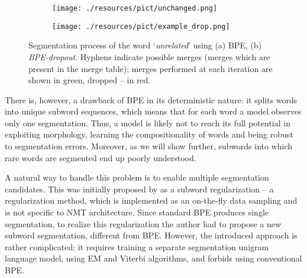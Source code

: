 \documentclass[11pt,a4paper]{article}
\begin{document}
\begin{figure*}[t!]
    \centering
    \begin{subfigure}[b]{0.18\textwidth}
        \texttt{[image: ./resources/pict/unchanged.png]}
        \caption{}
        \label{fig:examples_original}
    \end{subfigure}
    \quad\quad\quad\quad
    \begin{subfigure}[b]{0.65\textwidth}
        \texttt{[image: ./resources/pict/example\_drop.png]}
        \caption{}
        \label{fig:examples_dropout}
    \end{subfigure}
    \vspace{-1ex}
    \caption{Segmentation process of the word `\textit{unrelated}' using (a) BPE, (b) \textit{BPE-dropout}. Hyphens indicate possible merges (merges which are present in the merge table); merges performed at each iteration are shown in green, dropped -- in red. }\label{fig:intro_examples}
    \vspace{-2ex}
\end{figure*}


There is, however, a drawback of BPE in its deterministic nature: it splits words into unique subword sequences, which means that for each word a model observes only one segmentation. Thus, a model is likely not to reach its full potential in exploiting morphology, learning the compositionality of words and being robust to segmentation errors. Moreover, as we will show further, subwords into which rare words are segmented end up poorly understood.


A natural way to handle this problem is to enable multiple segmentation candidates. This was initially proposed by \citet{sentencepiece} as a subword regularization -- a regularization method, which is implemented as an on-the-fly data sampling and is not specific to NMT architecture.
Since standard BPE produces single segmentation, to realize this regularization the author had to propose a new subword segmentation, different from BPE. However, the introduced approach is rather complicated: it requires training a separate segmentation unigram language model, using EM and Viterbi algorithms, and forbids using conventional BPE.
\end{document}
